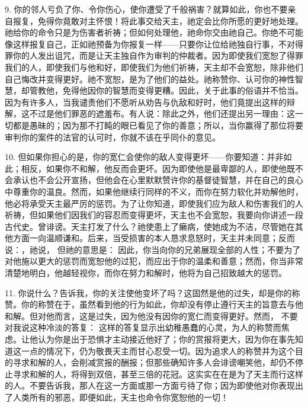 9. 你的邻人亏负了你、令你伤心，使你遭受了千般祸害？就算如此，你也不要亲自报复，免得你竟敢对主怀恨！将此事交给天主，祂定会比你所愿的更好地处理。祂给你的命令只是为伤害者祈祷；但如何处理他，祂命你交由祂自己。你绝不可能像这样报复自己，正如祂预备为你报复一样——只要你让位给祂独自行事，不对得罪你的人发出诅咒，而是让天主独自作为审判的仲裁者。因为即使我们宽恕了得罪我们的人，即使我们与他和好，即使我们为他们祈祷，天主却不会宽恕，除非他们自己悔改并变得更好。祂不宽恕，是为了他们的益处。祂称赞你、认可你的神性智慧，却管教他，免得他因你的智慧而变得更糟。因此，关于此事的俗语并不恰当。因为有许多人，当我谴责他们不愿听从劝告与仇敌和好时，他们竟提出这样的辩解，这不过是他们罪恶的遮羞布。有人说：除此之外，他们还提出另一理由：这一切都是愚昧的；因为那不打盹的眼已看见了你的善意；所以，当你赢得了那位将要审判你的案件的法官的认可时，你就不该在乎同仆的意见。\par

10. 但如果你担心的是，你的宽仁会使你的敌人变得更坏——你要知道：并非如此；相反，如果你不和解，他反而会更坏。因为即使他是最卑鄙的人，即使他既不会承认也不会公开宣扬，但他会在心里默默赞许你的基督徒智慧，并在自己的良心中尊重你的温良。然而，如果他继续行同样的不义，而你在努力软化并劝解他时，他必将承受天主最严厉的惩罚。为了让你知道，即使我们应为敌人和伤害我们的人祈祷，但如果他们因我们的容忍而变得更坏，天主也不会宽恕，我要向你讲述一段古代史。曾诽谤。天主打发了什么？祂使患上了癞病，使她成为不洁，尽管她在其他方面一向温顺谦和。后来，当受损害的本人恳求息怒时，天主并未同意；反而说：，祂说，  但祂的意思是： 因此，你当向你的兄弟展现全部的人性；不要为了对他施以更大的惩罚而宽恕他的过犯，而应出于你的温柔和善意；然而，你当非常清楚地明白，他越轻视你，而你在努力和解时，他将为自己招致越大的惩罚。\par

11. 你说什么？告诉我，你的关注使他变坏了吗？这固然是他的过失，却是你的称赞。你的称赞在于，虽然看到他的行为如此，你却没有停止遵行天主的旨意去与他和解。但对他而言，这是过失，因为他没有因你的宽仁而变得更好。然而， 不要对我说这种冷淡的答复： 这样的答复显示出幼稚愚蠢的心灵，为人的称赞而焦虑。让他认为你是出于恐惧才主动接近他好了；你的赏报将更大，因为你在事先知道这一点的情况下，仍为敬畏天主而甘心忍受一切。因为追求人的称赞并为这个目的寻求和解的人，会削减赏报的酬报；但那些确知许多人会诽谤嘲笑他，却仍不停止寻求和解的人，将得到双倍，甚至三倍的花冠。这实实在在是为了天主而行这样的人。不要告诉我，那人在这一方面或那一方面亏待了你；因为即使他对你表现出了人类所有的邪恶，即便如此，天主也命令你宽恕他的一切！\par

